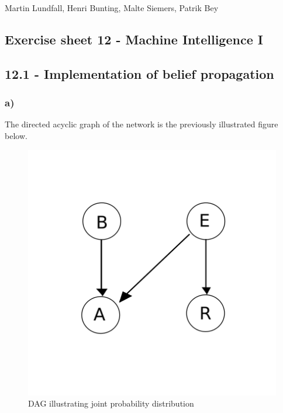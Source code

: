 \documentclass[11pt,a4paper]{article}
\begin{document}
	\noindent
	Martin Lundfall, Henri Bunting, Malte Siemers, Patrik Bey
	\begin{centering}
		\section*{Exercise sheet 12 - Machine Intelligence I}
	\end{centering}
	\subsection*{12.1 - Implementation of belief propagation}
\subsubsection*{a)}
The directed acyclic graph of the network is the previously illustrated figure below.
	\begin{figure}[h]
		\caption{DAG illustrating joint probability distribution}
		\centering
		\includegraphics[width=.5\textwidth]{graph}
	\end{figure}
\end{document}
